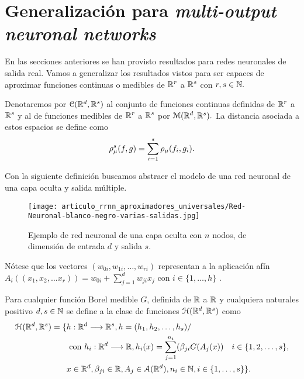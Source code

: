 %
\section{Generalización para \textit{multi-output neuronal networks}}

En las secciones anteriores se han provisto resultados para redes 
neuronales de salida real. Vamos a generalizar los resultados vistos
para ser capaces de aproximar funciones continuas o medibles 
de $\mathbb{R}^r$ a $\mathbb{R}^s$ con $r,s \in \mathbb{N}.$

Denotaremos por $\mathcal{C}(\mathbb{R}^d ,\mathbb{R}^s)$ al conjunto de funciones continuas definidas de $\mathbb{R}^r$ a $\mathbb{R}^s$ y al de funciones medibles de 
$\mathbb{R}^r$ a $\mathbb{R}^s$  por $\mathcal{M}(\mathbb{R}^d , \mathbb{R}^s).$ 
La distancia asociada a estos espacios se define como 
\begin{equation}
    \rho_{\mu}^s(f,g) 
    =
    \sum_{i=1}^s \rho_{\mu}(f_i, g_i).
\end{equation}

Con la siguiente definición buscamos abstraer el modelo de una red neuronal de una capa oculta y salida múltiple.
\begin{figure}[h]
    \centering
    \texttt{[image: articulo\_rrnn\_aproximadores\_universales/Red-Neuronal-blanco-negro-varias-salidas.jpg]}
    \caption{Ejemplo de red neuronal de una capa oculta con $n$ nodos, de dimensión de entrada $d$ y salida $s$.}
    \label{fig:red neuronal-r-h-s}
\end{figure}

Nótese que los vectores $(w_{0i},w_{1 i}, \ldots, w_{r i})$ representan a la aplicación afín 
$A_i((x_1, x_2, \ldots x_r)) = w_{0i} + \sum_{j=1}^d w_{ji} x_j$
con $i \in \{1,\ldots, h\}$ . 

\begin{definicion} 
    Para cualquier función Borel medible $G$, definida de $\mathbb{R}$ a $\mathbb{R}$ y cualquiera naturales positivo
    $d,s \in \mathbb{N}$ se define a la clase de funciones $\mathcal{H}(\mathbb{R}^d,\mathbb{R}^s)$ como 
    \begin{equation}
        \begin{split}
        \mathcal{H}(\mathbb{R}^d,\mathbb{R}^s) = 
        \{ 
            & h: \mathbb{R} ^d \longrightarrow \mathbb{R}^s, h= (h_1, h_2, \ldots, h_s)  / \quad 
            \\ &
            \text{ con } h_i : \mathbb{R} ^d\longrightarrow \mathbb{R}, 
            h_i(x)=\sum_{j = 1} ^{n_i} (
            \beta_{j i} G(A_{j}(x)) \quad i \in \{1,2,\ldots, s\}, \\
            & x  \in \mathbb{R} ^d, \beta_{j i} \in \mathbb{R}, A_{j}\in \mathcal{A}(\mathbb{R}^d),n_i \in \mathbb{N}, i \in \{1,\ldots, s\} 
        \}.
        \end{split}
    \end{equation}
\end{definicion}

